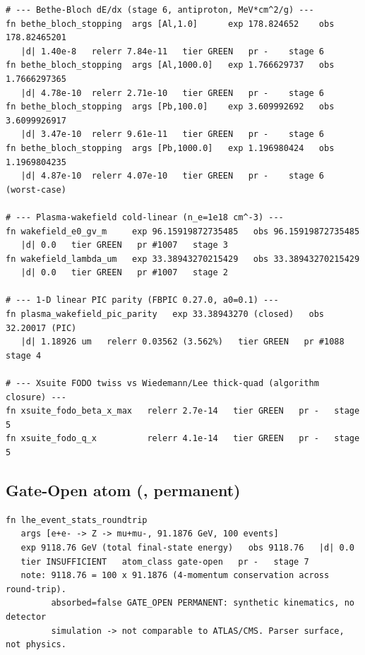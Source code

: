 \begin{lstlisting}
# --- Bethe-Bloch dE/dx (stage 6, antiproton, MeV*cm^2/g) ---
fn bethe_bloch_stopping  args [Al,1.0]      exp 178.824652    obs 178.82465201
   |d| 1.40e-8   relerr 7.84e-11   tier GREEN   pr -    stage 6
fn bethe_bloch_stopping  args [Al,1000.0]   exp 1.766629737   obs 1.7666297365
   |d| 4.78e-10  relerr 2.71e-10   tier GREEN   pr -    stage 6
fn bethe_bloch_stopping  args [Pb,100.0]    exp 3.609992692   obs 3.6099926917
   |d| 3.47e-10  relerr 9.61e-11   tier GREEN   pr -    stage 6
fn bethe_bloch_stopping  args [Pb,1000.0]   exp 1.196980424   obs 1.1969804235
   |d| 4.87e-10  relerr 4.07e-10   tier GREEN   pr -    stage 6   (worst-case)

# --- Plasma-wakefield cold-linear (n_e=1e18 cm^-3) ---
fn wakefield_e0_gv_m     exp 96.15919872735485   obs 96.15919872735485
   |d| 0.0   tier GREEN   pr #1007   stage 3
fn wakefield_lambda_um   exp 33.38943270215429   obs 33.38943270215429
   |d| 0.0   tier GREEN   pr #1007   stage 2

# --- 1-D linear PIC parity (FBPIC 0.27.0, a0=0.1) ---
fn plasma_wakefield_pic_parity   exp 33.38943270 (closed)   obs 32.20017 (PIC)
   |d| 1.18926 um   relerr 0.03562 (3.562%)   tier GREEN   pr #1088   stage 4

# --- Xsuite FODO twiss vs Wiedemann/Lee thick-quad (algorithm closure) ---
fn xsuite_fodo_beta_x_max   relerr 2.7e-14   tier GREEN   pr -   stage 5
fn xsuite_fodo_q_x          relerr 4.1e-14   tier GREEN   pr -   stage 5
\end{lstlisting}

\subsection{Gate-Open atom (\tierOrange, permanent)}
\label{app:vl-orange}

\begin{lstlisting}
fn lhe_event_stats_roundtrip
   args [e+e- -> Z -> mu+mu-, 91.1876 GeV, 100 events]
   exp 9118.76 GeV (total final-state energy)   obs 9118.76   |d| 0.0
   tier INSUFFICIENT   atom_class gate-open   pr -   stage 7
   note: 9118.76 = 100 x 91.1876 (4-momentum conservation across round-trip).
         absorbed=false GATE_OPEN PERMANENT: synthetic kinematics, no detector
         simulation -> not comparable to ATLAS/CMS. Parser surface, not physics.
\end{lstlisting}

